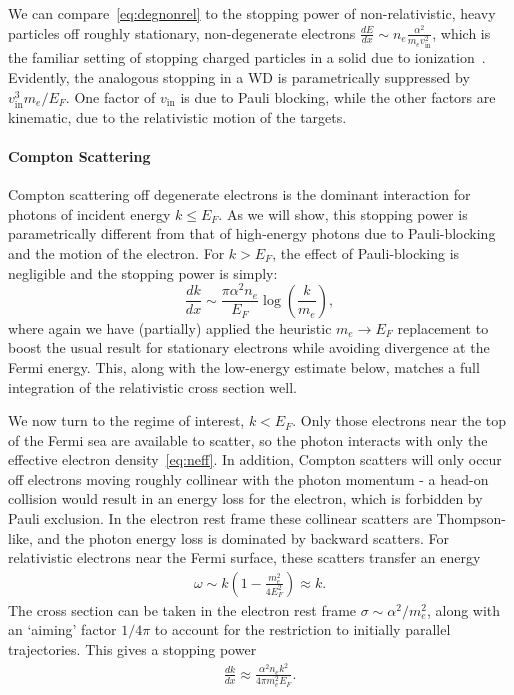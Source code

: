 \documentclass[preprintnumbers,amsmath,amssymb,prd,superscriptaddress]{revtex4}
\newcommand{\x}[1]{\ensuremath{\text{#1}}} %
\def\r{\right)}
\def\l{\left(}
\begin{document}
\begin{appendices}
We can compare~\eqref{eq:degnonrel} to the stopping power of non-relativistic, heavy particles off roughly stationary, non-degenerate electrons $\frac{dE}{dx} \sim n_e \frac{\alpha^2}{m_e v_\text{in}^2}$, which is the familiar setting of stopping charged particles in a solid due to ionization~\cite{Rossi}.
Evidently, the analogous stopping in a WD is parametrically suppressed by $v_\x{in}^3 m_e/E_F$.
One factor of $v_\x{in}$ is due to Pauli blocking, while the other factors are kinematic, due to the relativistic motion of the targets.

\paragraph{Compton Scattering}
\label{sec:compton}
Compton scattering off degenerate electrons is the dominant interaction for photons of incident energy $k \leq E_F$.
As we will show, this stopping power is parametrically different from that of high-energy photons due to Pauli-blocking and the motion of the electron.
For $k>E_F$, the effect of Pauli-blocking is negligible and the stopping power is simply:
\begin{equation}
\frac{dk}{dx} \sim \frac{\pi \alpha^2 n_e}{E_F} \log\l \frac{k}{m_e}\r,
\end{equation}
where again we have (partially) applied the heuristic $m_e \rightarrow E_F$ replacement to boost the usual result for stationary electrons while avoiding divergence at the Fermi energy.
This, along with the low-energy estimate below, matches a full integration of the relativistic cross section well.

We now turn to the regime of interest, $k < E_F$.
Only those electrons near the top of the Fermi sea are available to scatter, so the photon interacts with only the effective electron density~\eqref{eq:neff}.
In addition, Compton scatters will only occur off electrons moving roughly collinear with the photon momentum - a head-on collision would result in an energy loss for the electron, which is forbidden by Pauli exclusion.
In the electron rest frame these collinear scatters are Thompson-like, and the photon energy loss is dominated by backward scatters.
For relativistic electrons near the Fermi surface, these scatters transfer an energy
\begin{align}
  \omega \sim k \l 1 - \frac{m_e^2}{4 E_F^2} \r \approx k.
\end{align}
The cross section can be taken in the electron rest frame $\sigma \sim \alpha^2/m_e^2$, along with an `aiming' factor $1/4\pi$ to account for the restriction to initially parallel trajectories.
This gives a stopping power
\begin{align}
  \frac{dk}{dx} \approx \frac{\alpha^2 n_e k^2}{4 \pi m_e^2 E_F}.
\end{align}

\end{appendices}
\end{document}
